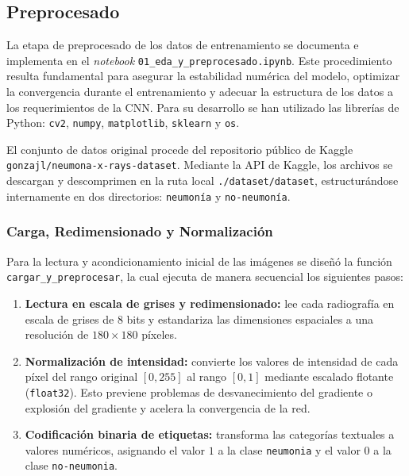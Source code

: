 \documentclass[11pt, a4paper]{article}
\numberwithin{equation}{section}
\begin{document}
\newpage
\subsection{Preprocesado}

La etapa de preprocesado de los datos de entrenamiento se documenta e implementa en el \textit{notebook} \texttt{01\_eda\_y\_preprocesado.ipynb}. Este procedimiento resulta fundamental para asegurar la estabilidad numérica del modelo, optimizar la convergencia durante el entrenamiento y adecuar la estructura de los datos a los requerimientos de la CNN. Para su desarrollo se han utilizado las librerías de Python: \texttt{cv2}, \texttt{numpy}, \texttt{matplotlib}, \texttt{sklearn} y \texttt{os}.

El conjunto de datos original procede del repositorio público de Kaggle \texttt{gonzajl/neumona-x-rays-dataset}. Mediante la API de Kaggle, los archivos se descargan y descomprimen en la ruta local \texttt{./dataset/dataset}, estructurándose internamente en dos directorios: \texttt{neumonía} y \texttt{no-neumonía}.

\subsubsection{Carga, Redimensionado y Normalización}

Para la lectura y acondicionamiento inicial de las imágenes se diseñó la función \texttt{cargar\_y\_preprocesar}, la cual ejecuta de manera secuencial los siguientes pasos:

\begin{enumerate}
\item \textbf{Lectura en escala de grises y redimensionado:} lee cada radiografía en escala de grises de 8 bits y estandariza las dimensiones espaciales a una resolución de $180 \times 180$ píxeles.

\item \textbf{Normalización de intensidad:} convierte los valores de intensidad de cada píxel del rango original $[0, 255]$ al rango $[0, 1]$ mediante escalado flotante (\texttt{float32}). Esto previene problemas de desvanecimiento del gradiente o explosión del gradiente y acelera la convergencia de la red.

\item \textbf{Codificación binaria de etiquetas:} transforma las categorías textuales a valores numéricos, asignando el valor $1$ a la clase \texttt{neumonia} y el valor $0$ a la clase \texttt{no-neumonia}.
\end{enumerate}
\end{document}
